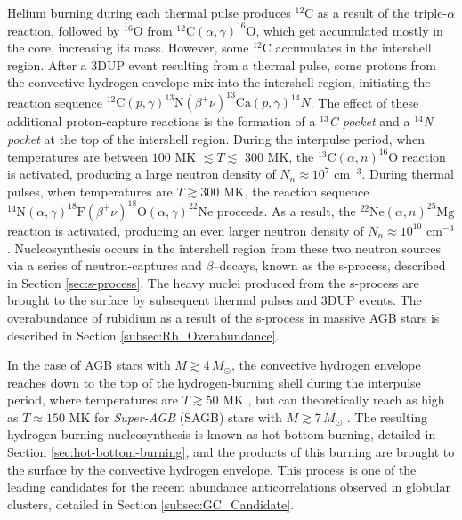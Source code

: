 Helium burning during each thermal pulse produces $^{12}$C as a result of the triple-$\alpha$ reaction, followed by $^{16}$O from $^{12}\mathrm{C}(\alpha,\gamma)^{16}\mathrm{O}$, which get accumulated mostly in the core, increasing its mass. However, some $^{12}$C accumulates in the intershell region. After a 3DUP event resulting from a thermal pulse, some protons from the convective hydrogen envelope mix into the intershell region, initiating the reaction sequence $^{12}\mathrm{C}(p,\gamma)^{13}\mathrm{N}(\beta^{+}\nu)^{13}\mathrm{Ca}(p,\gamma)^{14}N$. The effect of these additional proton-capture reactions is the formation of a \emph{$^{13}$C pocket} and a \emph{$^{14}$N pocket} at the top of the intershell region. During the interpulse period, when temperatures are between $100$ MK $\lesssim T \lesssim$ 300 MK, the $^{13}\mathrm{C}(\alpha,n)^{16}\mathrm{O}$ reaction is activated, producing a large neutron density of $N_{n} \approx 10^{7}$ $\mathrm{cm}^{-3}$. During thermal pulses, when temperatures are $T \gtrsim 300$ MK, the reaction sequence $^{14}\mathrm{N}(\alpha,\gamma)^{18}\mathrm{F}(\beta^{+}\nu)^{18}\mathrm{O}(\alpha,\gamma)^{22}\mathrm{Ne}$ proceeds. As a result, the $^{22}\mathrm{Ne}(\alpha,n)^{25}\mathrm{Mg}$ reaction is activated, producing an even larger neutron density of $N_{n} \approx 10^{10}$ $\mathrm{cm}^{-3}$. Nucleosynthesis occurs in the intershell region from these two neutron sources via a series of neutron-captures and $\beta$--decays, known as the s-process, described in Section \ref{sec:s-process}. The heavy nuclei produced from the s-process are brought to the surface by subsequent thermal pulses and 3DUP events. The overabundance of rubidium as a result of the s-process in massive AGB stars is described in Section \ref{subsec:Rb_Overabundance}.

In the case of AGB stars with $M \gtrsim 4 \, M_{\odot}$, the convective hydrogen envelope reaches down to the top of the hydrogen-burning shell during the interpulse period, where temperatures are $T \gtrsim 50$ MK \cite{Iliadis2015}, but can theoretically reach as high as $T \approx 150$ MK for \emph{Super-AGB} (SAGB) stars with $M \gtrsim 7 \, M_{\odot}$ \cite{Ventura2012}. The resulting hydrogen burning nucleosynthesis is known as hot-bottom burning, detailed in Section \ref{sec:hot-bottom-burning}, and the products of this burning are brought to the surface by the convective hydrogen envelope. This process is one of the leading candidates for the recent abundance anticorrelations observed in globular clusters, detailed in Section \ref{subsec:GC_Candidate}.

